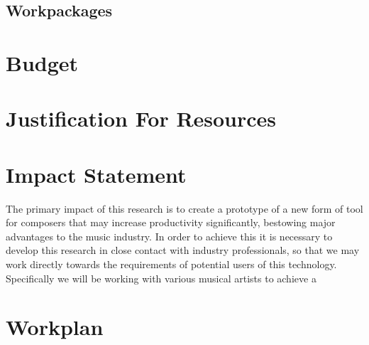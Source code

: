 \documentclass[11pt]{article}
\begin{document}
	\subsection{Workpackages}
	
	\section{Budget}
	
	\section{Justification For Resources}
	
	\section{Impact Statement}
	
	The primary impact of this research is to create a prototype of a new form of tool for composers that may increase productivity significantly, bestowing major advantages to the music industry. In order to achieve this it is necessary to develop this research in close contact with industry professionals, so that we may work directly towards the requirements of potential users of this technology. Specifically we will be working with various musical artists to achieve a 
	
	
	
	\section{Workplan}
	
	\printbibliography
	
\end{document}
